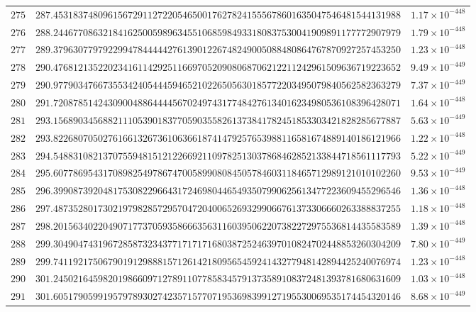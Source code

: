 \documentclass[12pt,reqno]{amsart}
\theoremstyle{remark}
\begin{document}
\begin{longtable}{clc}
$275$ & $287.4531837480961567291127220546500176278241555678601635047546481544131988$ & $1.17\times 10^{-448}$ \\
$276$ & $288.2446770863218416250059896345510685984933180837530041909891177772907979$ & $1.79\times 10^{-448}$ \\
$277$ & $289.3796307797922994784444427613901226748249005088480864767870927257453250$ & $1.23\times 10^{-448}$ \\
$278$ & $290.4768121352202341611429251166970520908068706212211242961509636719223652$ & $9.49\times 10^{-449}$ \\
$279$ & $290.9779034766735534240544459465210226505630185772203495079840562582363279$ & $7.37\times 10^{-449}$ \\
$280$ & $291.7208785142430900488644445670249743177484276134016234980536108396428071$ & $1.64\times 10^{-448}$ \\
$281$ & $293.1568903456882111053901837705903558261373841782451853303421828285677887$ & $5.63\times 10^{-449}$ \\
$282$ & $293.8226807050276166132673610636618741479257653988116581674889140186121966$ & $1.22\times 10^{-448}$ \\
$283$ & $294.5488310821370755948151212266921109782513037868462852133844718561117793$ & $5.22\times 10^{-449}$ \\
$284$ & $295.6077869543170898254978674700589908084505784603118465712989121010102260$ & $9.53\times 10^{-449}$ \\
$285$ & $296.3990873920481753082296643172469804465493507990625613477223609455296546$ & $1.36\times 10^{-448}$ \\
$286$ & $297.4873528017302197982857295704720400652693299066761373306660263388837255$ & $1.18\times 10^{-448}$ \\
$287$ & $298.2015634022049071773705935866635631160395062207382272975536814435583589$ & $1.39\times 10^{-448}$ \\
$288$ & $299.3049047431967285873234377171717168038725246397010824702448853260304209$ & $7.80\times 10^{-449}$ \\
$289$ & $299.7411921750679019129888157126142180956545924143277948142894425240076974$ & $1.23\times 10^{-448}$ \\
$290$ & $301.2450216459820198660971278911077858345791373589108372481393781680631609$ & $1.03\times 10^{-448}$ \\
$291$ & $301.6051790599195797893027423571577071953698399127195530069535174454320146$ & $8.68\times 10^{-449}$ \\

\end{longtable}
\end{document}
